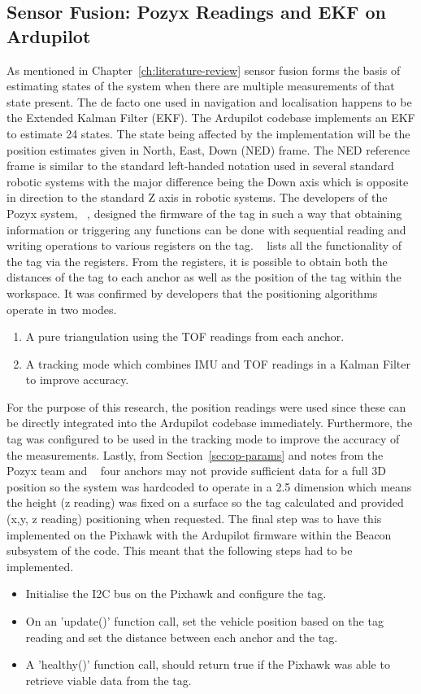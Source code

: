 \subsection{Sensor Fusion: Pozyx Readings and EKF on Ardupilot}\label{subsec:sensor-fusion}
As mentioned in Chapter~\ref{ch:literature-review} sensor fusion forms the basis of estimating states of the system when there are multiple measurements of that state present.
The de facto one used in navigation and localisation happens to be the Extended Kalman Filter (EKF).
The Ardupilot codebase implements an EKF to estimate 24 states.
The state being affected by the implementation will be the position estimates given in North, East, Down (NED) frame.
The NED reference frame is similar to the standard left-handed notation used in several standard robotic systems with the major difference being the Down axis which is opposite in direction to the standard Z axis in robotic systems.
The developers of the Pozyx system, ~\cite{pozyx2018pozyx}, designed the firmware of the tag in such a way that obtaining information or triggering any functions can be done with sequential reading and writing operations to various registers on the tag.
~\citet{devregs} lists all the functionality of the tag via the registers.
From the registers, it is possible to obtain both the distances of the tag to each anchor as well as the position of the tag within the workspace.
It was confirmed by developers that the positioning algorithms operate in two modes.
\begin{enumerate}
    \item A pure triangulation using the TOF readings from each anchor.
    \item A tracking mode which combines IMU and TOF readings in a Kalman Filter to improve accuracy.
\end{enumerate}
For the purpose of this research, the position readings were used since these can be directly integrated into the Ardupilot codebase immediately.
Furthermore, the tag was configured to be used in the tracking mode to improve the accuracy of the measurements.
Lastly, from Section~\ref{sec:op-params} and notes from the Pozyx team and ~\citet{evaluwb} four anchors may not provide sufficient data for a full 3D position so the system was hardcoded to operate in a 2.5 dimension which means the height (z reading) was fixed on a surface so the tag calculated and provided (x,y, z reading) positioning when requested.
The final step was to have this implemented on the Pixhawk with the Ardupilot firmware within the Beacon subsystem of the code.
This meant that the following steps had to be implemented.
\begin{itemize}
    \item Initialise the I2C bus on the Pixhawk and configure the tag.
    \item On an 'update()' function call, set the vehicle position based on the tag reading and set the distance between each anchor and the tag.
    \item A 'healthy()' function call, should return true if the Pixhawk was able to retrieve viable data from the tag.
\end{itemize}

